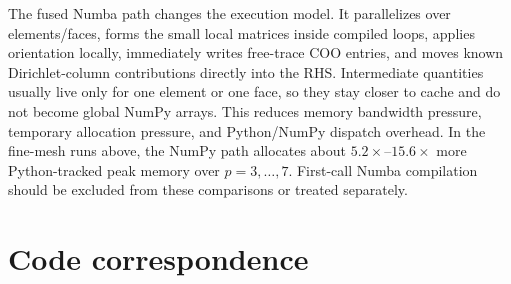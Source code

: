 \documentclass[11pt]{article}
\begin{document}
The fused Numba path changes the execution model.  It parallelizes over
elements/faces, forms the small local matrices inside compiled loops, applies
orientation locally, immediately writes free-trace COO entries, and moves known
Dirichlet-column contributions directly into the RHS.  Intermediate quantities
usually live only for one element or one face, so they stay closer to cache and
do not become global NumPy arrays.  This reduces memory bandwidth pressure,
temporary allocation pressure, and Python/NumPy dispatch overhead.  In the
fine-mesh runs above, the NumPy path allocates about
$5.2\times$--$15.6\times$ more Python-tracked peak memory over $p=3,\ldots,7$.
First-call Numba compilation should be excluded from these comparisons or
treated separately.

\section{Code correspondence}
\end{document}
